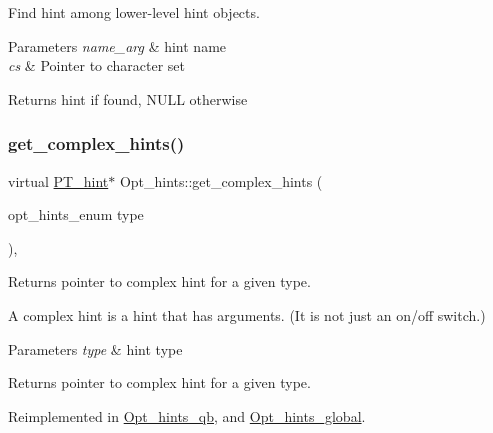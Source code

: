 Find hint among lower-\/level hint objects.


\begin{DoxyParams}{Parameters}
{\em name\+\_\+arg} & hint name \\
\hline
{\em cs} & Pointer to character set\\
\hline
\end{DoxyParams}
\begin{DoxyReturn}{Returns}
hint if found, N\+U\+LL otherwise 
\end{DoxyReturn}
\mbox{\label{classOpt__hints_a3dd8eb290a7b81d9a6d849de18a61cba}} 
\subsubsection{\texorpdfstring{get\+\_\+complex\+\_\+hints()}{get\_complex\_hints()}}
{\footnotesize\ttfamily virtual \mbox{\hyperlink{classPT__hint}{P\+T\+\_\+hint}}$\ast$ Opt\+\_\+hints\+::get\+\_\+complex\+\_\+hints (\begin{DoxyParamCaption}\item[{opt\+\_\+hints\+\_\+enum}]{type }\end{DoxyParamCaption})\hspace{0.3cm}{\ttfamily [inline]}, {\ttfamily [virtual]}}

Returns pointer to complex hint for a given type.

A complex hint is a hint that has arguments. (It is not just an on/off switch.)


\begin{DoxyParams}{Parameters}
{\em type} & hint type\\
\hline
\end{DoxyParams}
\begin{DoxyReturn}{Returns}
pointer to complex hint for a given type. 
\end{DoxyReturn}


Reimplemented in \mbox{\hyperlink{classOpt__hints__qb_a6312e36d56b68d1c8622482d39dc580b}{Opt\+\_\+hints\+\_\+qb}}, and \mbox{\hyperlink{classOpt__hints__global_a7750a4f66503e4b91a924ad269f52fd9}{Opt\+\_\+hints\+\_\+global}}.

\mbox{\label{classOpt__hints_a0208b5809c213bd831cfb4f4bc8b6ade}} 
